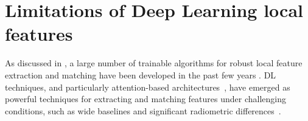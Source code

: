 

\section{Limitations of Deep Learning local features}\label{sec:5:limitation_dl_feats}

As discussed in , a large number of trainable algorithms for robust local feature extraction and matching have been developed in the past few years \citep{remondino2022_at_with_dl}.
DL techniques, and particularly attention-based architectures~\citep{vaswani2023attention}, have emerged as powerful techniques for extracting and matching features under challenging conditions, such as wide baselines and significant radiometric differences~\citep{jin_image_2021, Yao_2021}.


